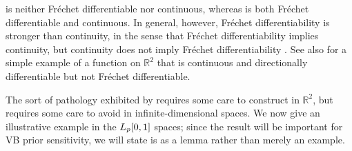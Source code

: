  is neither Fr{\'e}chet differentiable nor continuous,
whereas  is both Fr{\'e}chet differentiable and
continuous.  In general, however, Fr{\'e}chet differentiability is stronger than
continuity, in the sense that Fr{\'e}chet differentiability implies continuity,
but continuity does not imply Fr{\'e}chet differentiability \citep[Proposition
4.8 (d)]{zeidler:2013:functional}.  See also \citet[Example
1.9]{averbukh:1967:theory} for a simple example of a function on $\mathbb{R}^2$
that is continuous and directionally differentiable but not Fr{\'e}chet
differentiable.

The sort of pathology exhibited by 
requires some care to construct in $\mathbb{R}^2$, but requires some care to
avoid in infinite-dimensional spaces.  We now give an illustrative example in
the ${L_{p}[0,1]}$ spaces; since the result will be important for VB prior
sensitivity, we will state is as a lemma rather than merely an example.


